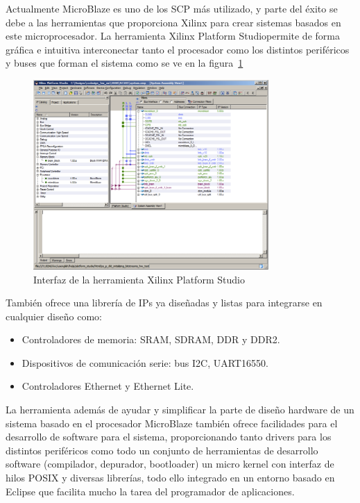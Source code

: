Actualmente MicroBlaze es uno de los SCP más utilizado, y parte del éxito se debe
a las herramientas que proporciona Xilinx para crear sistemas basados en este
microprocesador. La herramienta Xilinx Platform Studio\cite{Etiqueta26}permite de forma gráfica e
intuitiva interconectar tanto el procesador como los distintos periféricos y buses que forman
el sistema como se ve en la figura~\ref{fig:Xilinx Platform Studio}

\begin{figure}[h!]
 	\begin{center}
  	\includegraphics[width=0.8\textwidth,keepaspectratio=true]{./images/herramientaxps}
  	\caption{Interfaz de la herramienta Xilinx Platform Studio}
  	\label{fig:Xilinx Platform Studio}
 	\end{center}
	\end{figure}

También ofrece una librería de IPs ya diseñadas y listas para integrarse en cualquier diseño como:

		\begin{itemize}
		  \item  Controladores de memoria: SRAM, SDRAM, DDR y DDR2.
	 	 \item  Dispositivos de comunicación serie: bus I2C, UART16550.
	 	 \item Controladores Ethernet y Ethernet Lite.
		\end{itemize}

La herramienta además de ayudar y simplificar la parte de diseño hardware de un sistema basado en el procesador MicroBlaze también ofrece facilidades para el desarrollo de software para el sistema, proporcionando tanto drivers para los distintos periféricos como todo un conjunto de herramientas de desarrollo software (compilador, depurador, bootloader) un micro kernel con interfaz de hilos POSIX y diversas librerías, todo ello integrado en un entorno basado en Eclipse\cite{Etiqueta27} que facilita mucho la tarea del programador de aplicaciones.

